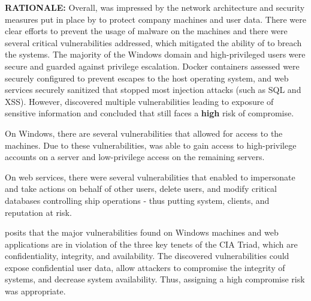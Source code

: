 \newpage

\textbf{RATIONALE:} Overall, \team was impressed by the network architecture and security measures put in place by \client to protect company machines and user data. There were clear efforts to prevent the usage of malware on the machines and there were several critical vulnerabilities addressed, which mitigated the ability of \team to breach the systems. The majority of the Windows domain and high-privileged users were secure and guarded against privilege escalation. Docker containers assessed were securely configured to prevent escapes to the host operating system, and web services securely sanitized that stopped most injection attacks (such as SQL and XSS). However, \team discovered multiple vulnerabilities leading to exposure of sensitive information and concluded that \client still faces a \textbf{\textcolor{highRed}{high}} risk of compromise. 

On Windows, there are several vulnerabilities that allowed for access to the machines. Due to these vulnerabilities, \team was able to gain access to high-privilege accounts on a server and low-privilege access on the remaining servers.

On \clientP web services, there were several vulnerabilities that enabled \team to impersonate and take actions on behalf of other users, delete users, and modify critical databases controlling ship operations - thus putting \clientP system, clients, and reputation at risk.

\team posits that the major vulnerabilities found on \clientP Windows machines and web applications are in violation of the three key tenets of the CIA Triad, which are confidentiality, integrity, and availability. The discovered vulnerabilities could expose confidential user data, allow attackers to compromise the integrity of \client systems, and decrease system availability. Thus, assigning \client a high compromise risk was appropriate.








